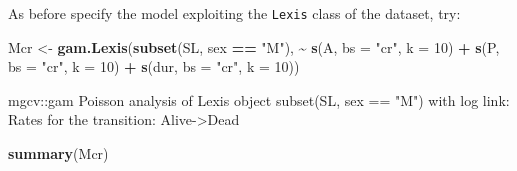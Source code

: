 \documentclass[
]{book}
\newenvironment{Shaded}{\begin{snugshade}}{\end{snugshade}}
\newcommand{\AttributeTok}[1]{\textcolor[rgb]{0.13,0.29,0.53}{#1}}
\newcommand{\DecValTok}[1]{\textcolor[rgb]{0.00,0.00,0.81}{#1}}
\newcommand{\FunctionTok}[1]{\textcolor[rgb]{0.13,0.29,0.53}{\textbf{#1}}}
\newcommand{\NormalTok}[1]{#1}
\newcommand{\OtherTok}[1]{\textcolor[rgb]{0.56,0.35,0.01}{#1}}
\newcommand{\SpecialCharTok}[1]{\textcolor[rgb]{0.81,0.36,0.00}{\textbf{#1}}}
\newcommand{\StringTok}[1]{\textcolor[rgb]{0.31,0.60,0.02}{#1}}
\begin{document}
\begin{enumerate}
  As before specify the model exploiting the \texttt{Lexis} class
  of the dataset, try:

\begin{Shaded}
\begin{Highlighting}[]
\NormalTok{Mcr }\OtherTok{\textless{}{-}} \FunctionTok{gam.Lexis}\NormalTok{(}\FunctionTok{subset}\NormalTok{(SL, sex }\SpecialCharTok{==} \StringTok{"M"}\NormalTok{),}
                 \SpecialCharTok{\textasciitilde{}} \FunctionTok{s}\NormalTok{(A, }\AttributeTok{bs =} \StringTok{"cr"}\NormalTok{, }\AttributeTok{k =} \DecValTok{10}\NormalTok{) }\SpecialCharTok{+}
                   \FunctionTok{s}\NormalTok{(P, }\AttributeTok{bs =} \StringTok{"cr"}\NormalTok{, }\AttributeTok{k =} \DecValTok{10}\NormalTok{) }\SpecialCharTok{+}
                 \FunctionTok{s}\NormalTok{(dur, }\AttributeTok{bs =} \StringTok{"cr"}\NormalTok{, }\AttributeTok{k =} \DecValTok{10}\NormalTok{))}
\end{Highlighting}
\end{Shaded}

\begin{Shaded}
\begin{Highlighting}[]
\NormalTok{mgcv::gam Poisson analysis of Lexis object subset(SL, sex == "M") with log link:}
\NormalTok{Rates for the transition:}
\NormalTok{Alive{-}\textgreater{}Dead}
\end{Highlighting}
\end{Shaded}

\begin{Shaded}
\begin{Highlighting}[]
\FunctionTok{summary}\NormalTok{(Mcr)}
\end{Highlighting}
\end{Shaded}

\begin{Shaded}
\end{Shaded}
\end{enumerate}
\end{document}
